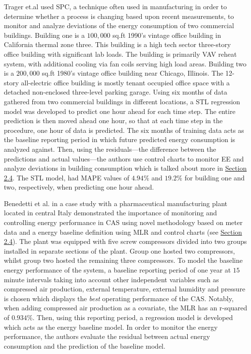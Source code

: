 Trager et.al \cite{tightening} used SPC, a technique often used in manufacturing in order to determine whether a process is changing based upon recent measurements, to monitor and analyze deviations of the energy consumption of two commercial buildings. Building one is a $100,000$ \ac{sq.ft} 1990’s vintage office building in California thermal zone three. This building is a high tech sector three-story office building with significant lab loads. The building is primarily \ac{VAV} reheat system, with additional cooling via fan coils serving high load areas. Building two is a $200,000$ sq.ft 1980’s vintage office building near Chicago, Illinois. The 12-story all-electric office building is mostly tenant occupied office space with a detached non-enclosed three-level parking garage. Using six months of data gathered from two commercial buildings in different locations, a \ac{STL} regression model was developed to predict one hour ahead for each time step. The entire prediction is then moved ahead one hour, so that at each time step in the procedure, one hour of data is predicted. The six months of training data acts as the baseline reporting period in which future predicted energy consumption is analyzed against. Then, using the residuals—the difference between the predictions and actual values—the authors use control charts to monitor EE and analyze deviations in building consumption which is talked about more in \hyperlink{subsection.2.4}{Section 2.4}. The STL model, had \ac{MAPE} values of $4.94\%$ and $19.2\%$ for building one and two, respectively, when predicting one hour ahead.

Benedetti et al. \cite{cas} in a case study with a pharmaceutical manufacturing plant located in central Italy demonstrated the importance of monitoring and controlling energy performance in \ac{CAS} using novel methodology based on meter data and a energy baseline definition using MLR and control charts (see \hyperlink{subsection.2.4}{Section 2.4}). The plant was equipped with five screw compressors divided into two groups installed in separate sections of the plant. Group one hosted two compressors, whilst group two hosted the remaining three compressors. To model the baseline energy performance of the system, a baseline reporting period of one year at $15$ minute intervals taking into account other independent variables such as compressed air production, external temperature, external humidity and pressure is chosen which displays the \textit{best} operating performance of the CAS. Notably, when adding compressed air production as a covariate, the MLR has an \ac{r-squared} of $0.934\%$. Then, using this reporting period, a regression model is developed which acts as the energy baseline model. In order to monitor the energy performance, the authors evaluate the residual between actual energy consumption and the prediction of the baseline model.


